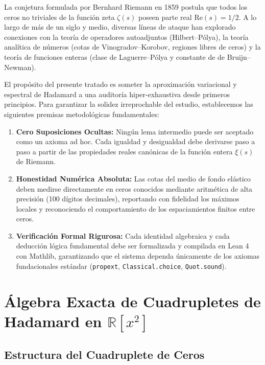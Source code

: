 \documentclass[11pt,a4paper]{article}
\theoremstyle{definition}
\theoremstyle{remark}
\begin{document}
La conjetura formulada por Bernhard Riemann en 1859 postula que todos los ceros no triviales de la función zeta $\zeta(s)$ poseen parte real $\mathrm{Re}(s) = 1/2$. A lo largo de más de un siglo y medio, diversas líneas de ataque han explorado conexiones con la teoría de operadores autoadjuntos (Hilbert--Pólya), la teoría analítica de números (cotas de Vinogradov--Korobov, regiones libres de ceros) y la teoría de funciones enteras (clase de Laguerre--Pólya y constante de de Bruijn--Newman).

El propósito del presente tratado es someter la aproximación variacional y espectral de Hadamard a una auditoría hiper-exhaustiva desde primeros principios. Para garantizar la solidez irreprochable del estudio, establecemos las siguientes premisas metodológicas fundamentales:
\begin{enumerate}
    \item \textbf{Cero Suposiciones Ocultas:} Ningún lema intermedio puede ser aceptado como un axioma ad hoc. Cada igualdad y desigualdad debe derivarse paso a paso a partir de las propiedades reales canónicas de la función entera $\xi(s)$ de Riemann.
    \item \textbf{Honestidad Numérica Absoluta:} Las cotas del medio de fondo elástico deben medirse directamente en ceros conocidos mediante aritmética de alta precisión (100 dígitos decimales), reportando con fidelidad los máximos locales y reconociendo el comportamiento de los espaciamientos finitos entre ceros.
    \item \textbf{Verificación Formal Rigurosa:} Cada identidad algebraica y cada deducción lógica fundamental debe ser formalizada y compilada en Lean 4 con Mathlib, garantizando que el sistema dependa únicamente de los axiomas fundacionales estándar (\texttt{propext}, \texttt{Classical.choice}, \texttt{Quot.sound}).
\end{enumerate}

\section{Álgebra Exacta de Cuadrupletes de Hadamard en \texorpdfstring{$\mathbb{R}[x^2]$}{R[x\textasciicircum 2]}}

\subsection{Estructura del Cuadruplete de Ceros}
\end{document}

